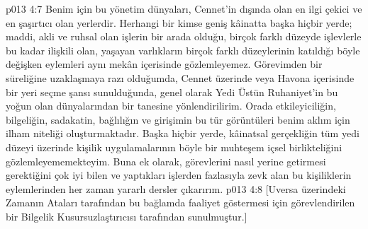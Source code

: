 \vs p013 4:7 Benim için bu yönetim dünyaları, Cennet’in dışında olan en ilgi çekici ve en şaşırtıcı olan yerlerdir. Herhangi bir kimse geniş kâinatta başka hiçbir yerde; maddi, akli ve ruhsal olan işlerin bir arada olduğu, birçok farklı düzeyde işlevlerle bu kadar ilişkili olan, yaşayan varlıkların birçok farklı düzeylerinin katıldığı böyle değişken eylemleri aynı mekân içerisinde gözlemleyemez. Görevimden bir süreliğine uzaklaşmaya razı olduğumda, Cennet üzerinde veya Havona içerisinde bir yeri seçme şansı sunulduğunda, genel olarak Yedi Üstün Ruhaniyet’in bu yoğun olan dünyalarından bir tanesine yönlendirilirim. Orada etkileyiciliğin, bilgeliğin, sadakatin, bağlılığın ve girişimin bu tür görüntüleri benim aklım için ilham niteliği oluşturmaktadır. Başka hiçbir yerde, kâinatsal gerçekliğin tüm yedi düzeyi üzerinde kişilik uygulamalarının böyle bir muhteşem içsel birlikteliğini gözlemleyememekteyim. Buna ek olarak, görevlerini nasıl yerine getirmesi gerektiğini çok iyi bilen ve yaptıkları işlerden fazlasıyla zevk alan bu kişiliklerin eylemlerinden her zaman yararlı dersler çıkarırım.
\vs p013 4:8 [Uversa üzerindeki Zamanın Ataları tarafından bu bağlamda faaliyet göstermesi için görevlendirilen bir Bilgelik Kusursuzlaştırıcısı tarafından sunulmuştur.]
